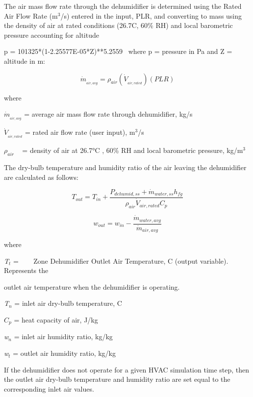 The air mass flow rate through the dehumidifier is determined using the Rated Air Flow Rate (m\(^{3}\)/s) entered in the input, PLR, and converting to mass using the density of air at rated conditions (26.7C, 60\% RH) and local barometric pressure accounting for altitude

p = 101325*(1-2.25577E-05*Z)**5.2559~ where p = pressure in Pa and Z = altitude in m:

\begin{equation}
{\dot m_{_{air,avg}}} = {\rho_{air}}\left( {{{\dot V}_{_{air,rated}}}} \right)\left( {PLR} \right)
\end{equation}

where

\({\dot m_{_{air,avg}}}\) = average air mass flow rate through dehumidifier, kg/s

\({\dot V_{_{air,rated}}}\) = rated air flow rate (user input), m\(^{3}\)/s

\({\rho_{air}}\) ~ = density of air at 26.7°C , 60\% RH and local barometric pressure, kg/m\(^{3}\)

The dry-bulb temperature and humidity ratio of the air leaving the dehumidifier are calculated as follows:

\begin{equation}
  T_{out} = T_{in} + \frac{P_{dehumid,ss} + \dot{m}_{water,ss} h_{fg}} {\rho_{air} \dot{V}_{air,rated} C_p}
\end{equation}

\begin{equation}
  w_{out} = w_{in} - \frac{\dot{m}_{water,avg}}{\dot{m}_{air,avg}}
\end{equation}

where

\emph{T\(_{t}\)} = ~~~ Zone Dehumidifier Outlet Air Temperature, C (output variable). Represents the

outlet air temperature when the dehumidifier is operating.

\emph{T\(_{n}\)} = inlet air dry-bulb temperature, C

\({C_p}\) = heat capacity of air, J/kg

\emph{w\(_{n}\)} = inlet air humidity ratio, kg/kg

\emph{w\(_{t}\)} = outlet air humidity ratio, kg/kg

If the dehumidifier does not operate for a given HVAC simulation time step, then the outlet air dry-bulb temperature and humidity ratio are set equal to the corresponding inlet air values.

